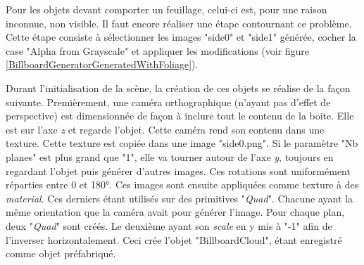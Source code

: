		Pour les objets devant comporter un feuillage, celui-ci est, pour une raison inconnue, non visible. Il faut encore réaliser une étape contournant ce problème. Cette étape consiste à sélectionner les images "side0" et "side1" générée, cocher la case "Alpha from Grayscale" et appliquer les modifications (voir figure \ref{BillboardGeneratorGeneratedWithFoliage}).\medskip		
		
		\begin{minipage}{\linewidth}
			\label{BillboardGeneratorGeneratedWithFoliage}
		\end{minipage}\medskip
		
		Durant l'initialisation de la scène, la création de ces objets se réalise de la façon suivante. Premièrement, une caméra orthographique (n'ayant pas d'effet de perspective) est dimensionnée de façon à inclure tout le contenu de la boite. Elle est sur l'axe \textit{z} et regarde l'objet. Cette caméra rend son contenu dans une texture. Cette texture est copiée dans une image "side0.png". Si le paramètre "Nb planes" est plus grand que "1", elle va tourner autour de l'axe \textit{y}, toujours en regardant l'objet puis générer d'autres images. Ces rotations sont uniformément réparties entre 0 et 180°. Ces images sont ensuite appliquées comme texture à des \textit{material}. Ces derniers étant utilisés sur des primitives "\textit{Quad}". Chacune ayant la même orientation que la caméra avait pour générer l'image. Pour chaque plan, deux "\textit{Quad}" sont créés. Le deuxième ayant son \textit{scale} en y mis à "-1" afin de l'inverser horizontalement. Ceci crée l'objet "BillboardCloud", étant enregistré comme objet préfabriqué.
		\\
		

